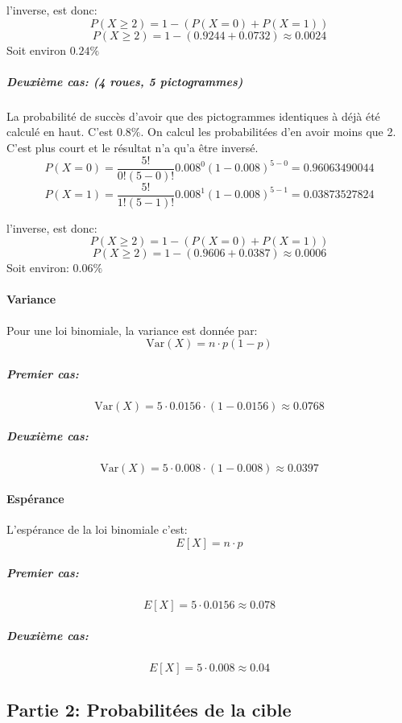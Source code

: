 l'inverse, est donc: \[
P(X \ge 2)=1 - (P(X=0)+P(X=1))
\] \[
P(X \ge 2)=1 - (0.9244 + 0.0732) \approx 0.0024
\] Soit environ \(0.24\%\)

\subparagraph{Deuxième cas: (4 roues, 5
pictogrammes)}\label{deuxiuxe8me-cas-4-roues-5-pictogrammes}

La probabilité de succès d'avoir que des pictogrammes identiques à déjà
été calculé en haut. C'est \(0.8\%\). On calcul les probabilitées d'en
avoir moins que 2. C'est plus court et le résultat n'a qu'a être
inversé. \[
P(X=0)=\frac{5!}{0!(5-0)!}0.008^0(1-0.008)^{5-0}=0.96063490044
\] \[
P(X=1)=\frac{5!}{1!(5-1)!}0.008^1(1-0.008)^{5-1}=0.03873527824
\]

l'inverse, est donc: \[
P(X \ge 2)=1 - (P(X=0)+P(X=1))
\] \[
P(X \ge 2)=1 - (0.9606 + 0.0387) \approx 0.0006
\] Soit environ: \(0.06\%\)

\paragraph{Variance}\label{variance}

Pour une loi binomiale, la variance est donnée par: \[
\mathrm{Var}(X)=n \cdot p (1-p)
\]

\subparagraph{Premier cas:}\label{premier-cas}

\[
\mathrm{Var}(X)=5 \cdot 0.0156 \cdot (1-0.0156) \approx 0.0768
\]

\subparagraph{Deuxième cas:}\label{deuxiuxe8me-cas}

\[
\mathrm{Var}(X)=5 \cdot 0.008 \cdot (1-0.008) \approx 0.0397
\]

\paragraph{Espérance}\label{espuxe9rance}

L'espérance de la loi binomiale c'est: \[
E[X]=n \cdot p
\]

\subparagraph{Premier cas:}\label{premier-cas-1}

\[
E[X]=5 \cdot 0.0156 \approx 0.078
\]

\subparagraph{Deuxième cas:}\label{deuxiuxe8me-cas-1}

\[
E[X]=5 \cdot 0.008 \approx 0.04
\]

    \subsection{Partie 2: Probabilitées de la
cible}\label{partie-2-probabilituxe9es-de-la-cible}

